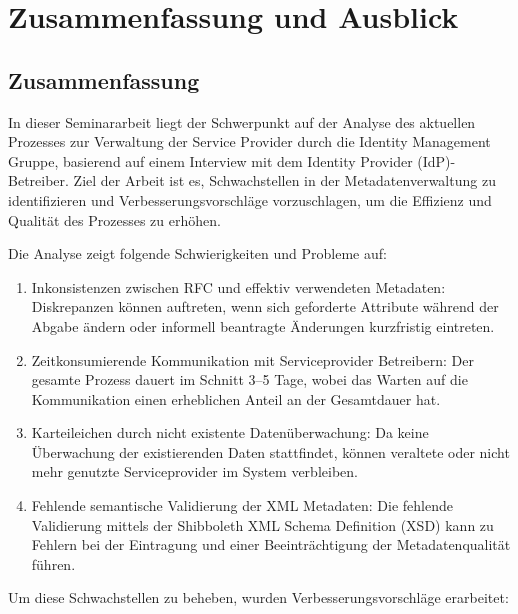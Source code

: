\section{Zusammenfassung und Ausblick}\label{sec:summary}
\subsection{Zusammenfassung}\label{subsec:summary}
In dieser Seminararbeit liegt der Schwerpunkt auf der Analyse des aktuellen Prozesses zur Verwaltung der Service Provider durch die Identity Management Gruppe, basierend auf einem Interview mit dem Identity Provider (IdP)-Betreiber.
Ziel der Arbeit ist es, Schwachstellen in der Metadatenverwaltung zu identifizieren und Verbesserungsvorschläge vorzuschlagen, um die Effizienz und Qualität des Prozesses zu erhöhen.

Die Analyse zeigt folgende Schwierigkeiten und Probleme auf:

\begin{enumerate}
    \item Inkonsistenzen zwischen RFC und effektiv verwendeten Metadaten: Diskrepanzen können auftreten, wenn sich geforderte Attribute während der Abgabe ändern oder informell beantragte Änderungen kurzfristig eintreten.
    \item Zeitkonsumierende Kommunikation mit Serviceprovider Betreibern: Der gesamte Prozess dauert im Schnitt 3--5 Tage, wobei das Warten auf die Kommunikation einen erheblichen Anteil an der Gesamtdauer hat.
    \item Karteileichen durch nicht existente Datenüberwachung: Da keine Überwachung der existierenden Daten stattfindet, können veraltete oder nicht mehr genutzte Serviceprovider im System verbleiben.
    \item Fehlende semantische Validierung der XML Metadaten: Die fehlende Validierung mittels der Shibboleth XML Schema Definition (XSD) kann zu Fehlern bei der Eintragung und einer Beeinträchtigung der Metadatenqualität führen.
\end{enumerate}

Um diese Schwachstellen zu beheben, wurden Verbesserungsvorschläge erarbeitet:

